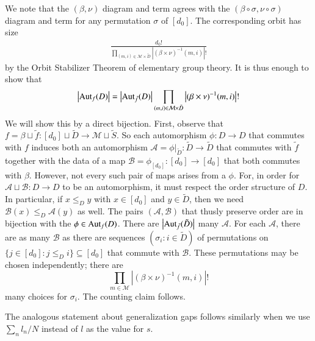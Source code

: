 \documentclass{article}
\newcommand{\Aut}{\text{\textnormal{Aut}}}
\newcommand{\Aa}{\mathcal{A}}
\newcommand{\Bb}{\mathcal{B}}
\newcommand{\Mm}{\mathcal{M}}
\newcommand{\wabs}[1]{\left|#1\right|}
\begin{document}
            We note that the $(\beta, \nu)$ diagram and term agrees with the
            $(\beta \circ \sigma, \nu \circ \sigma)$ diagram and term for any
            permutation $\sigma$ of $[d_0]$.  The corresponding orbit has size
            \begin{align*}
                \frac{d_0!}{
                    \prod_{(m, i) \in \Mm \times \tilde D}
                        \wabs{(\beta \times \nu)^{-1}(m, i)}!
                }
            \end{align*}
            by the Orbit Stabilizer Theorem of elementary group theory.
            It is thus enough to show that
            $$
                \wabs{\Aut_f(D)} = 
                \wabs{\Aut_{\tilde f}(D)}
                \prod_{(m, i) \in \Mm \times \tilde D}
                    \wabs{(\beta \times \nu)^{-1}(m, i)}!
            $$
            We will show this by a direct bijection.  First, observe that
            $
                f = \beta \sqcup \tilde f:
                    [d_0] \sqcup \tilde D \to \Mm \sqcup \tilde S
            $. 
            So each automorphism $\phi: D\to D$ that commutes with $f$ induces
            both an automorphism
            $
                \Aa = \phi|_{\tilde D}: \tilde D\to \tilde D
            $
            that commutes with $\tilde f$ together with the data of a map
            $
                \Bb = \phi_{[d_0]}: [d_0] \to [d_0] 
            $
            that both commutes with $\beta$.  However, not every such pair of
            maps arises from a $\phi$.  For, in order for $\Aa \sqcup \Bb: D
            \to D$ to be an automorphism, it must respect the order structure
            of $D$.  In particular, if $x\leq_D y$ with $x \in [d_0]$ and $y
            \in \tilde D$, then we need $\Bb(x) \leq_D \Aa(y)$ as well.  The
            pairs $(\Aa, \Bb)$ that thusly preserve order are in bijection with
            the $\phi \in \Aut_f(D)$.  There are $\wabs{\Aut_{\tilde f}(\tilde
            D)}$ many $\Aa$.  For each $\Aa$, there are as many $\Bb$ as there
            are sequences $(\sigma_i: i \in \tilde D)$ of permutations on
            $
                \{j\in [d_0]: j\leq_D i\} \subseteq [d_0]
            $ 
            that commute with $\Bb$.  These permutations may be chosen independently;
            there are 
            $$
                \prod_{m\in \Mm}
                    \wabs{(\beta \times \nu)^{-1}(m, i)}!
            $$
            many choices for $\sigma_i$.  The counting claim follows.
 
            The analogous statement about generalization gaps follows similarly
            when we use $\sum_n l_n/N$ instead of $l$ as the value for $s$. 
\end{document}
